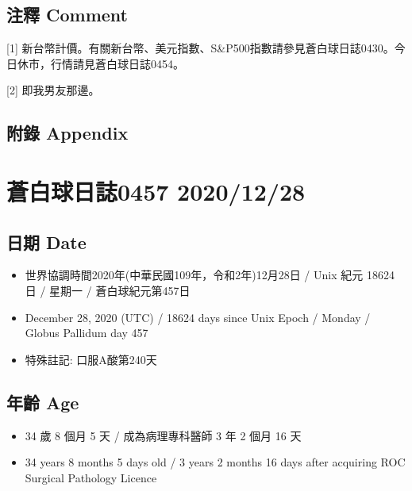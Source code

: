 \documentclass[a5paper, 11pt
]{book}
\providecommand{\tightlist}{%
  \setlength{\itemsep}{0pt}\setlength{\parskip}{0pt}}
\begin{document}
\hypertarget{ux6ce8ux91cb-comment-26}{%
\subsection{注釋 Comment}\label{ux6ce8ux91cb-comment-26}}

{[}1{]}
新台幣計價。有關新台幣、美元指數、S\&P500指數請參見蒼白球日誌0430。今日休市，行情請見蒼白球日誌0454。

{[}2{]} 即我男友那邊。

\hypertarget{ux9644ux9304-appendix-26}{%
\subsection{附錄 Appendix}\label{ux9644ux9304-appendix-26}}

\hypertarget{ux84bcux767dux7403ux65e5ux8a8c0457-20201228}{%
\section{蒼白球日誌0457
2020/12/28}\label{ux84bcux767dux7403ux65e5ux8a8c0457-20201228}}

\hypertarget{ux65e5ux671f-date-27}{%
\subsection{日期 Date}\label{ux65e5ux671f-date-27}}

\begin{itemize}
\tightlist
\item
  世界協調時間2020年(中華民國109年，令和2年)12月28日 / Unix 紀元 18624
  日 / 星期一 / 蒼白球紀元第457日
\item
  December 28, 2020 (UTC) / 18624 days since Unix Epoch / Monday /
  Globus Pallidum day 457
\item
  特殊註記: 口服A酸第240天
\end{itemize}

\hypertarget{ux5e74ux9f61-age-27}{%
\subsection{年齡 Age}\label{ux5e74ux9f61-age-27}}

\begin{itemize}
\tightlist
\item
  34 歲 8 個月 5 天 / 成為病理專科醫師 3 年 2 個月 16 天
\item
  34 years 8 months 5 days old / 3 years 2 months 16 days after
  acquiring ROC Surgical Pathology Licence
\end{itemize}
\end{document}
